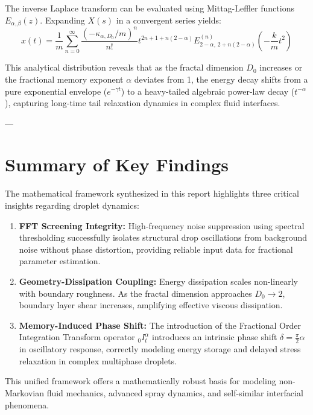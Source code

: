 \documentclass[11pt,a4paper]{article}
\begin{document}
The inverse Laplace transform can be evaluated using Mittag-Leffler functions $E_{\alpha, \beta}(z)$. Expanding $X(s)$ in a convergent series yields:
\begin{equation}
x(t) = \frac{1}{m} \sum_{n=0}^{\infty} \frac{(-\kappa_{\alpha, D_0} / m)^n}{n!} t^{2n + 1 + n(2-\alpha)} E_{2-\alpha, \, 2 + n(2-\alpha)}^{(n)} \left( -\frac{k}{m} t^2 \right)
\end{equation}

This analytical distribution reveals that as the fractal dimension $D_0$ increases or the fractional memory exponent $\alpha$ deviates from 1, the energy decay shifts from a pure exponential envelope ($e^{-\gamma t}$) to a heavy-tailed algebraic power-law decay ($t^{-\alpha}$), capturing long-time tail relaxation dynamics in complex fluid interfaces.

---

\section{Summary of Key Findings} \label{sec:conclusion}

The mathematical framework synthesized in this report highlights three critical insights regarding droplet dynamics:

\begin{enumerate}
    \item \textbf{FFT Screening Integrity:} High-frequency noise suppression using spectral thresholding successfully isolates structural drop oscillations from background noise without phase distortion, providing reliable input data for fractional parameter estimation.
    \item \textbf{Geometry-Dissipation Coupling:} Energy dissipation scales non-linearly with boundary roughness. As the fractal dimension approaches $D_0 \to 2$, boundary layer shear increases, amplifying effective viscous dissipation.
    \item \textbf{Memory-Induced Phase Shift:} The introduction of the Fractional Order Integration Transform operator ${}_0 I_t^\alpha$ introduces an intrinsic phase shift $\delta = \frac{\pi}{2}\alpha$ in oscillatory response, correctly modeling energy storage and delayed stress relaxation in complex multiphase droplets.
\end{enumerate}

This unified framework offers a mathematically robust basis for modeling non-Markovian fluid mechanics, advanced spray dynamics, and self-similar interfacial phenomena.
\end{document}
